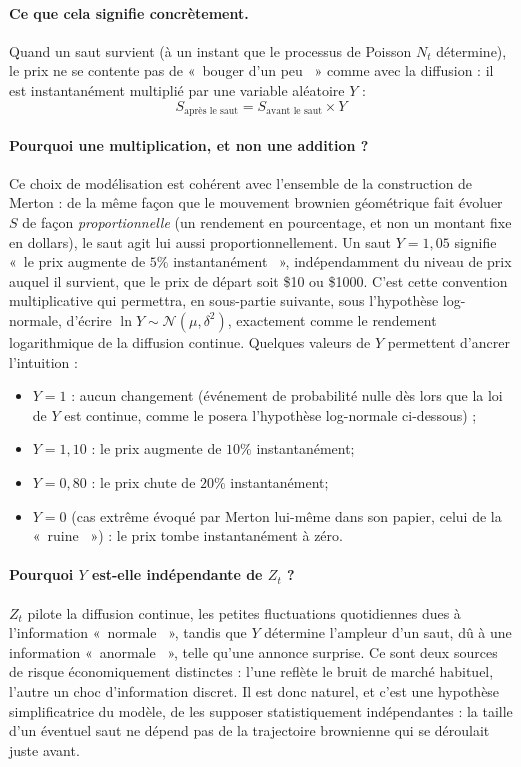 \documentclass{article}
\providecommand{\og}{«~}
\providecommand{\fg}{~»}
\begin{document}
\paragraph{Ce que cela signifie concrètement.} Quand un saut survient (à un instant que le processus de Poisson $N_t$ détermine), le prix ne se contente pas de \og bouger d'un peu \fg{} comme avec la diffusion : il est instantanément multiplié par une variable aléatoire $Y$ :
\begin{equation}
S_{\text{après le saut}} = S_{\text{avant le saut}} \times Y
\end{equation}
\paragraph{Pourquoi une multiplication, et non une addition ?} Ce choix de modélisation est cohérent avec l'ensemble de la construction de Merton : de la même façon que le mouvement brownien géométrique fait évoluer $S$ de façon \emph{proportionnelle} (un rendement en pourcentage, et non un montant fixe en dollars), le saut agit lui aussi proportionnellement. Un saut $Y=1{,}05$ signifie \og le prix augmente de $5\%$ instantanément \fg, indépendamment du niveau de prix auquel il survient, que le prix de départ soit \$10 ou \$1000. C'est cette convention multiplicative qui permettra, en sous-partie suivante, sous l'hypothèse log-normale, d'écrire $\ln Y \sim \mathcal{N}(\mu,\delta^2)$, exactement comme le rendement logarithmique de la diffusion continue.
Quelques valeurs de $Y$ permettent d'ancrer l'intuition :
\begin{itemize}
\item $Y=1$ : aucun changement (événement de probabilité nulle dès lors que la loi de $Y$ est continue, comme le posera l'hypothèse log-normale ci-dessous) ;
\item $Y=1{,}10$ : le prix augmente de $10\%$ instantanément;
\item $Y=0{,}80$ : le prix chute de $20\%$ instantanément;
\item $Y=0$ (cas extrême évoqué par Merton lui-même dans son papier, celui de la \og ruine \fg) : le prix tombe instantanément à zéro.
\end{itemize}
\paragraph{Pourquoi $Y$ est-elle indépendante de $Z_t$ ?} $Z_t$ pilote la diffusion continue, les petites fluctuations quotidiennes dues à l'information \og normale \fg{}, tandis que $Y$ détermine l'ampleur d'un saut, dû à une information \og anormale \fg{}, telle qu'une annonce surprise. Ce sont deux sources de risque économiquement distinctes : l'une reflète le bruit de marché habituel, l'autre un choc d'information discret. Il est donc naturel, et c'est une hypothèse simplificatrice du modèle, de les supposer statistiquement indépendantes : la taille d'un éventuel saut ne dépend pas de la trajectoire brownienne qui se déroulait juste avant. 
\end{document}

